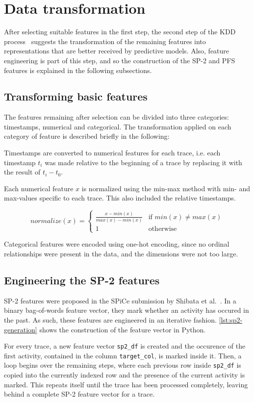 \section{Data transformation}
\label{sec:eval:data-transformation}
After selecting suitable features in the first step, the second step of the KDD process~\cite{fayyad1996data} suggests the transformation of the remaining features into representations that are better received by predictive models. Also, feature engineering is part of this step, and so the construction of the SP-2 and PFS features is explained in the following subsections.

\subsection*{Transforming basic features}
The features remaining after selection can be divided into three categories: timestamps, numerical and categorical. The transformation applied on each category of feature is described briefly in the following:

Timestamps are converted to numerical features for each trace, i.e. each timestamp $t_i$ was made relative to the beginning of a trace by replacing it with the result of $t_i - t_0$.

Each numerical feature $x$ is normalized using the min-max method with min- and max-values specific to each trace. This also included the relative timestamps.

$$normalize(x) =
\begin{cases}
\frac{x-min(x)}{max(x)-min(x)} & \text{if } min(x) \neq max(x)\\
1 & \text{otherwise}
\end{cases}
$$

Categorical features were encoded using one-hot encoding, since no ordinal relationships were present in the data, and the dimensions were not too large.

\subsection*{Engineering the SP-2 features}
SP-2 features were proposed in the SPiCe submission by Shibata et al.~\cite{shibata2016bipartite}. In a binary bag-of-words feature vector, they mark whether an activity has occured in the past. As such, these features are engineered in an iterative fashion. \autoref{lst:sp2-generation} shows the construction of the feature vector in Python.

For every trace, a new feature vector \texttt{sp2\_df} is created and the occurence of the first activity, contained in the column \verb=target_col=, is marked inside it. Then, a loop begins over the remaining steps, where each previous row inside \texttt{sp2\_df} is copied into the currently indexed row and the presence of the current activity is marked. This repeats itself until the trace has been processed completely, leaving behind a complete SP-2 feature vector for a trace.

